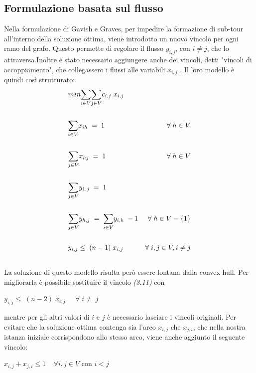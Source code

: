 \subsection{Formulazione basata sul flusso}
Nella formulazione di Gavish e Graves, per impedire la formazione di sub-tour all'interno della soluzione ottima, viene introdotto un nuovo vincolo per ogni ramo del grafo. Questo permette di regolare il flusso $y_{i,j}$, con $i\neq j$,  che lo attraversa.Inoltre è stato necessario aggiungere anche dei vincoli, detti "vincoli di accoppiamento", che collegassero i flussi alle variabili $x_{i,j}$ . Il loro modello è quindi così strutturato:
\begin{align}
& min\underset{i\in V}\sum{\underset{j\in V}\sum{c_{i,j}\; x_{i,j}}} \\ \notag \\
& \underset{i\in V}\sum{x_{ih}}\;=\;1 & \forall\;h\in V \\ \notag\\
& \underset{j\in V}\sum{x_{hj}}\;=\;1 & \forall\;h\in V \\ \notag\\
& \underset{j\in V}\sum{y_{1,j}}\;=\;1\\ \notag\\
& \underset{j\in V}\sum{y_{h,j}}\;=\;\underset{i\in V}\sum{y_{i,h}}\;-1 & \forall\;h\in V-\{1\}\\ \notag\\
& y_{i,j}\leq\;(n-1)\;x_{i,j} & \forall\;i,j\in V, i\neq j\\ \notag
\end{align}
La soluzione di questo modello risulta però essere lontana dalla convex hull. Per migliorarla è possibile sostituire il vincolo \textit{(3.11)} con \\
\begin{center}
$y_{i,j}\leq\;(n-2)\;x_{i,j} \;\;\;\;\;\forall\; i\neq \; j$\\
\end{center}
mentre per gli altri valori di $i$ e $j$ è necessario lasciare i vincoli originali. 
Per evitare che la soluzione ottima contenga sia l'arco $x_{i,j}$ che $x_{j,i}$, che nella nostra istanza iniziale corrispondono allo stesso arco, viene anche aggiunto il seguente vincolo:
\begin{center}
$x_{i,j}+x_{j,i}\leq 1\;\;\;\; \forall i,j \in V$ con $i < j$
\end{center}

